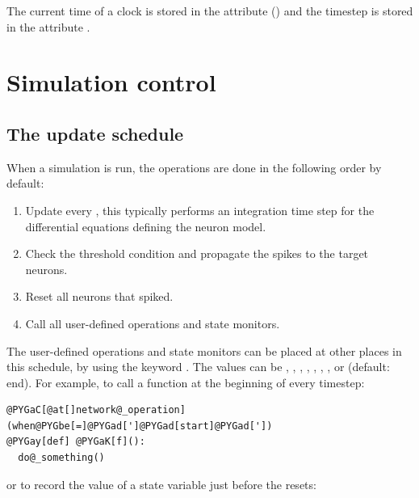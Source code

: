 \documentclass[letterpaper,10pt,english]{manual}
\begin{document}
The current time of a clock is stored in the attribute  () and
the timestep is stored in the attribute .

\resetcurrentobjects
{}

\hypertarget{index-109}{}\section{Simulation control}

\hypertarget{index-110}{}\subsection{The update schedule}

When a simulation is run, the operations are done in the following order by default:
\begin{enumerate}
\item {} 
Update every \hyperlink{brian.NeuronGroup}{}, this typically performs an integration time step for the differential equations defining the neuron model.

\item {} 
Check the threshold condition and propagate the spikes to the target neurons.

\item {} 
Reset all neurons that spiked.

\item {} 
Call all user-defined operations and state monitors.

\end{enumerate}

The user-defined operations and state monitors can be placed at other places in this schedule, by
using the keyword . The values can be , , ,
, , , ,  or
 (default: end). For example, to call a function  at the beginning of every timestep:

\begin{Verbatim}[commandchars=@\[\]]
@PYGaC[@at[]network@_operation](when@PYGbe[=]@PYGad[']@PYGad[start]@PYGad['])
@PYGay[def] @PYGaK[f]():
  do@_something()
\end{Verbatim}

or to record the value of a state variable just before the resets:
\end{document}
